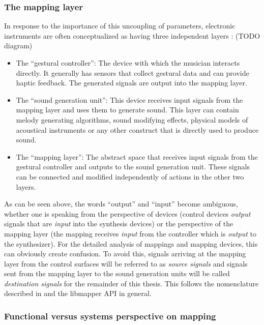 	\subsubsection{The mapping layer}

In response to the importance of this uncoupling of parameters, electronic instruments are often conceptualized as having three independent layers \cite{gestural_control_sound_synthesis}: (TODO diagram)

	\begin{itemize}
		\item The ``gestural controller'': The device with which the musician interacts directly. It generally has sensors that collect gestural data and can provide haptic feedback. The generated signals are output into the mapping layer.
		\item The ``sound generation unit'': This device receives input signals from the mapping layer and uses them to generate sound. This layer can contain melody generating algorithms, sound modifying effects, physical models of acoustical instruments or any other construct that is directly used to produce sound.
		\item The ``mapping layer'': The abstract space that receives input signals from the gestural controller and outputs to the sound generation unit. These signals can be connected and modified independently of actions in the other two layers.
	\end{itemize}

As can be seen above, the words ``output'' and ``input'' become ambiguous, whether one is speaking from the perspective of devices (control devices \emph{output} signals that are \emph{input} into the synthesis devices) or the perspective of the mapping layer (the mapping receives \emph{input} from the controller which is \emph{output} to the synthesizer). For the detailed analysis of mappings and mapping devices, this can obviously create confusion. To avoid this, signals arriving at the mapping layer from the control surfaces will be referred to as \emph{source signals} and signals sent from the mapping layer to the sound generation units will be called \emph{destination signals} for the remainder of this thesis. This follows the nomenclature described in  and the libmapper API in general.

	\subsubsection{Functional versus systems perspective on mapping}

